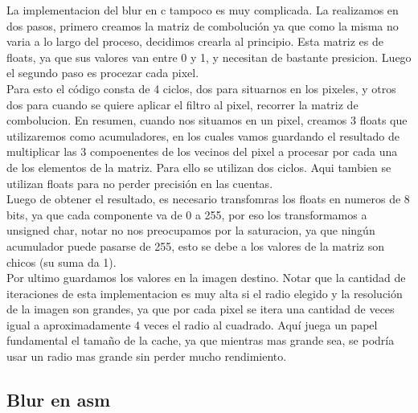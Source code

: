 La implementacion del blur en c tampoco es muy complicada. La realizamos en dos pasos, primero creamos la matriz de combolución ya que como la misma no varia a lo largo del proceso, decidimos crearla al principio. Esta matriz es de floats, ya que sus valores van entre 0 y 1, y necesitan de bastante presicion.  Luego el segundo paso es procezar cada pixel. \\
Para esto el código consta de 4 ciclos, dos para situarnos en los pixeles, y otros dos para cuando se quiere aplicar el filtro al pixel, recorrer la matriz de combolucion. En resumen, cuando nos situamos en un pixel, creamos 3 floats que utilizaremos como acumuladores, en los cuales vamos guardando el resultado de multiplicar las 3 compoenentes de los vecinos del pixel a procesar por cada una de los elementos de la matriz. Para ello se utilizan dos ciclos. Aqui tambien se utilizan floats para no perder precisión en las cuentas.\\
Luego de obtener el resultado, es necesario transfomras los floats en numeros de 8 bits, ya que cada componente va de 0 a 255, por eso los transformamos a unsigned char, notar no nos preocupamos por la saturacion, ya que ningún acumulador puede pasarse de 255, esto se debe a los valores de la matriz son chicos (su suma da 1). \\
Por ultimo guardamos los valores en la imagen destino. Notar que la cantidad de iteraciones de esta implementacion es muy alta si el radio elegido y la resolución de la imagen son grandes, ya que por cada pixel se itera una cantidad de veces igual a aproximadamente 4 veces el radio al cuadrado. Aquí juega un papel fundamental el tamaño de la cache, ya que mientras mas grande sea, se podría usar un radio mas grande sin perder mucho rendimiento. \\

\subsection{Blur en asm}

